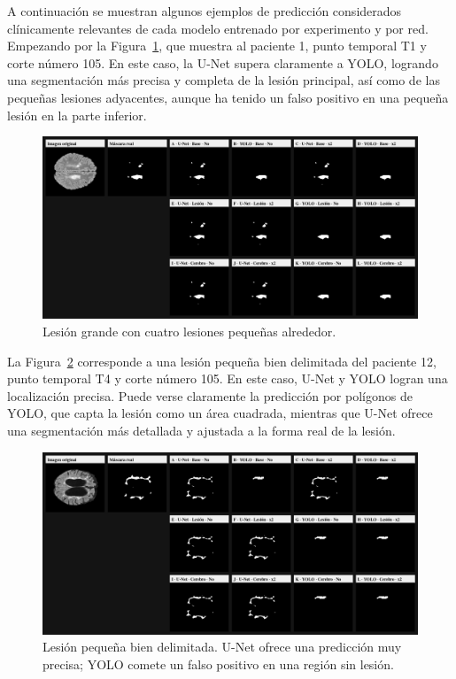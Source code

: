 \documentclass[../main.tex]{subfiles}
\begin{document}
A continuación se muestran algunos ejemplos de predicción considerados clínicamente relevantes de cada modelo entrenado por experimento y por red. Empezando por la Figura~\ref{fig:P1_T1_Z105_matriz_12exps}, que muestra al paciente 1, punto temporal T1 y corte número 105. En este caso, la U-Net supera claramente a YOLO, logrando una segmentación más precisa y completa de la lesión principal, así como de las pequeñas lesiones adyacentes, aunque ha tenido un falso positivo en una pequeña lesión en la parte inferior. 

\begin{figure}[H]
    \centering
    \includegraphics[width=1\linewidth]{imgs/resultados/comp/P1_T1_Z105_matriz_12exps.png}
    \caption{Lesión grande con cuatro lesiones pequeñas alrededor.}
    \label{fig:P1_T1_Z105_matriz_12exps}
\end{figure}

La Figura~\ref{fig:P12_T4_Z105_matriz_12exps} corresponde a una lesión pequeña bien delimitada del paciente 12, punto temporal T4 y corte número 105. En este caso, U-Net y YOLO logran una localización precisa. Puede verse claramente la predicción por polígonos de YOLO, que capta la lesión como un área cuadrada, mientras que U-Net ofrece una segmentación más detallada y ajustada a la forma real de la lesión. 

\begin{figure}[H]
    \centering
    \includegraphics[width=1\linewidth]{imgs/resultados/comp/P12_T4_Z105_matriz_12exps.png}
    \caption{Lesión pequeña bien delimitada. U-Net ofrece una predicción muy precisa; YOLO comete un falso positivo en una región sin lesión.}
    \label{fig:P12_T4_Z105_matriz_12exps}
\end{figure}
\end{document}
